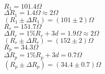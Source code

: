 \documentclass[11pt]{article}
\begin{document}
$R_1 = 101.4\Omega$\\
$\Delta R_1 = 1.4\Omega\approx 2\Omega$\\
$(R_1\pm\Delta R_1) = (101\pm 2)\Omega$\\

$R_r = 151.7\Omega$\\
$\Delta R_r = 1\%R_r+3d = 1.9\Omega\approx 2\Omega$\\
$(R_r\pm\Delta R_r) = (152\pm 2)\Omega$\\

$R_p = 34.3\Omega$\\
$\Delta R_p = 1\%R_p+3d = 0.7\Omega$\\
$(R_p\pm\Delta R_p) = (34.4\pm 0.7)\Omega$\\
\end{document}
